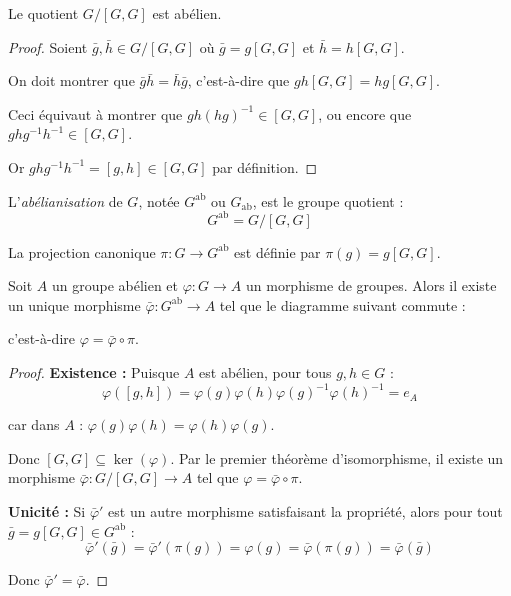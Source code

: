 \begin{proposition}
Le quotient $G/[G, G]$ est abélien.
\end{proposition}

\begin{proof}
Soient $\bar{g}, \bar{h} \in G/[G, G]$ où $\bar{g} = g[G, G]$ et $\bar{h} = h[G, G]$.

On doit montrer que $\bar{g}\bar{h} = \bar{h}\bar{g}$, c'est-à-dire que $gh[G, G] = hg[G, G]$.

Ceci équivaut à montrer que $gh(hg)^{-1} \in [G, G]$, ou encore que $ghg^{-1}h^{-1} \in [G, G]$.

Or $ghg^{-1}h^{-1} = [g, h] \in [G, G]$ par définition.
\end{proof}

\begin{definition}[Abélianisation]
L'\emph{abélianisation} de $G$, notée $G^{\text{ab}}$ ou $G_{\text{ab}}$, est le groupe quotient :
$$G^{\text{ab}} = G/[G, G]$$

La projection canonique $\pi : G \to G^{\text{ab}}$ est définie par $\pi(g) = g[G, G]$.
\end{definition}

\begin{theoreme}
Soit $A$ un groupe abélien et $\varphi : G \to A$ un morphisme de groupes. Alors il existe un unique morphisme $\bar{\varphi} : G^{\text{ab}} \to A$ tel que le diagramme suivant commute :
\begin{center}
\end{center}
c'est-à-dire $\varphi = \bar{\varphi} \circ \pi$.
\end{theoreme}

\begin{proof}
\textbf{Existence :} Puisque $A$ est abélien, pour tous $g, h \in G$ :
$$\varphi([g, h]) = \varphi(g)\varphi(h)\varphi(g)^{-1}\varphi(h)^{-1} = e_A$$

car dans $A$ : $\varphi(g)\varphi(h) = \varphi(h)\varphi(g)$.

Donc $[G, G] \subseteq \ker(\varphi)$. Par le premier théorème d'isomorphisme, il existe un morphisme $\bar{\varphi} : G/[G, G] \to A$ tel que $\varphi = \bar{\varphi} \circ \pi$.

\textbf{Unicité :} Si $\bar{\varphi}'$ est un autre morphisme satisfaisant la propriété, alors pour tout $\bar{g} = g[G, G] \in G^{\text{ab}}$ :
$$\bar{\varphi}'(\bar{g}) = \bar{\varphi}'(\pi(g)) = \varphi(g) = \bar{\varphi}(\pi(g)) = \bar{\varphi}(\bar{g})$$

Donc $\bar{\varphi}' = \bar{\varphi}$.
\end{proof}

